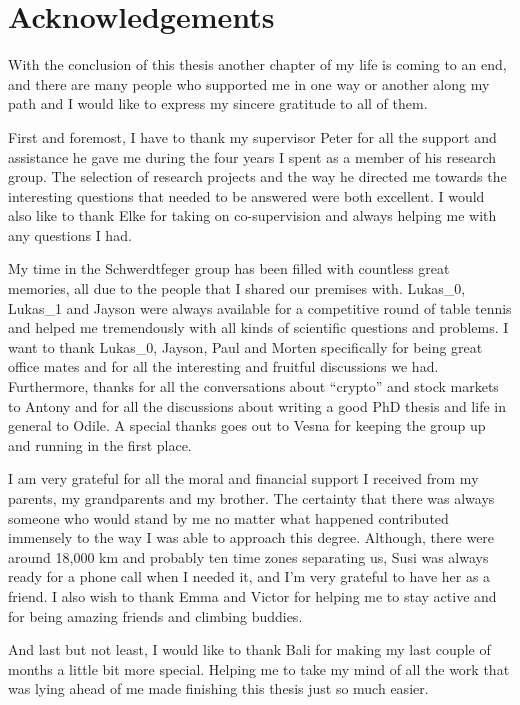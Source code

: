
\chapter*{Acknowledgements}

With the conclusion of this thesis another chapter of my life is coming to an
end, and there are many people who supported me in one way or another along my
path and I would like to express my sincere gratitude to all of them.

First and foremost, I have to thank my supervisor Peter for all the support and
assistance he gave me during the four years I spent as a member of his research
group. The selection of research projects and the way he directed me towards the
interesting questions that needed to be answered were both excellent. I would
also like to thank Elke for taking on co-supervision and always helping me with
any questions I had.

My time in the Schwerdtfeger group has been filled with countless great
memories, all due to the people that I shared our premises with. Lukas\_0,
Lukas\_1 and Jayson were always available for a competitive round of table
tennis and helped me tremendously with all kinds of scientific questions and
problems. I want to thank Lukas\_0, Jayson, Paul and Morten specifically for
being great office mates and for all the interesting and fruitful discussions we
had. Furthermore, thanks for all the conversations about ``crypto'' and stock
markets to Antony and for all the discussions about writing a good PhD thesis
and life in general to Odile. A special thanks goes out to Vesna for keeping the
group up and running in the first place.

I am very grateful for all the moral and financial support I received from my
parents, my grandparents and my brother. The certainty that there was always
someone  who would stand by me no matter what happened contributed immensely to
the way I was able to approach this degree. Although, there were around 18,000
km and probably ten time zones separating us, Susi was always ready for a phone
call when I needed it, and I'm very grateful to have her as a friend. I also
wish to thank Emma and Victor for helping me to stay active and for being
amazing friends and climbing buddies. 

And last but not least, I would like to thank Bali for making my last couple of
months a little bit more special. Helping me to take my mind of all the work
that was lying ahead of me made finishing this thesis just so much easier.

